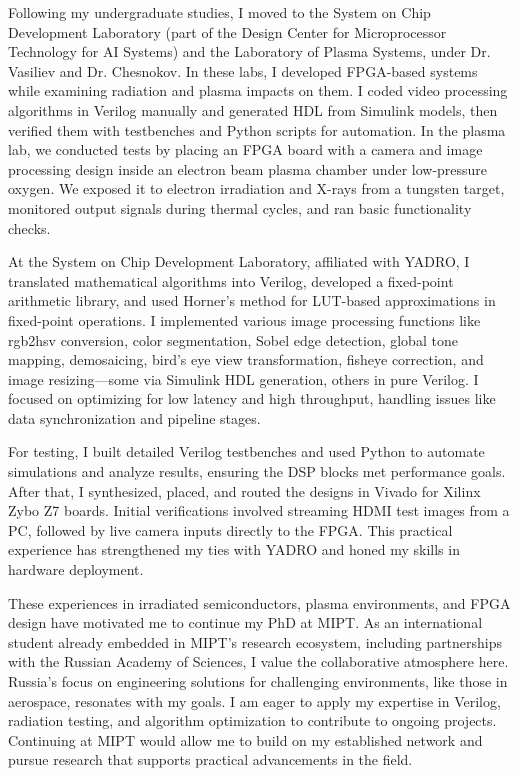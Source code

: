 \documentclass[a4paper,12pt]{article}
\begin{document}
\vspace{10pt}

Following my undergraduate studies, I moved to the System on Chip Development Laboratory (part of the Design Center for Microprocessor Technology for AI Systems) and the Laboratory of Plasma Systems, under Dr. Vasiliev and Dr. Chesnokov. In these labs, I developed FPGA-based systems while examining radiation and plasma impacts on them. I coded video processing algorithms in Verilog manually and generated HDL from Simulink models, then verified them with testbenches and Python scripts for automation. In the plasma lab, we conducted tests by placing an FPGA board with a camera and image processing design inside an electron beam plasma chamber under low-pressure oxygen. We exposed it to electron irradiation and X-rays from a tungsten target, monitored output signals during thermal cycles, and ran basic functionality checks.

\vspace{10pt}

\newpage

At the System on Chip Development Laboratory, affiliated with YADRO\footnotemark[2], I translated mathematical algorithms into Verilog, developed a fixed-point arithmetic library, and used Horner's method for LUT-based approximations in fixed-point operations. I implemented various image processing functions like rgb2hsv conversion, color segmentation, Sobel edge detection, global tone mapping, demosaicing, bird's eye view transformation, fisheye correction, and image resizing—some via Simulink HDL generation, others in pure Verilog. I focused on optimizing for low latency and high throughput, handling issues like data synchronization and pipeline stages.

\vspace{10pt}

For testing, I built detailed Verilog testbenches and used Python to automate simulations and analyze results, ensuring the DSP blocks met performance goals. After that, I synthesized, placed, and routed the designs in Vivado for Xilinx Zybo Z7 boards. Initial verifications involved streaming HDMI test images from a PC, followed by live camera inputs directly to the FPGA. This practical experience has strengthened my ties with YADRO and honed my skills in hardware deployment.

\vspace{10pt}

These experiences in irradiated semiconductors, plasma environments, and FPGA design have motivated me to continue my PhD at MIPT. As an international student already embedded in MIPT's research ecosystem, including partnerships with the Russian Academy of Sciences, I value the collaborative atmosphere here. Russia's focus on engineering solutions for challenging environments, like those in aerospace, resonates with my goals. I am eager to apply my expertise in Verilog, radiation testing, and algorithm optimization to contribute to ongoing projects. Continuing at MIPT would allow me to build on my established network and pursue research that supports practical advancements in the field.
\end{document}
